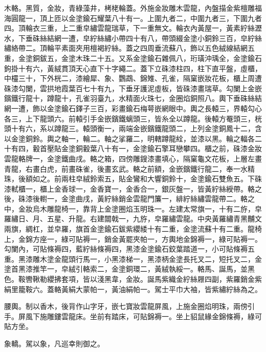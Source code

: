 \begin{pinyinscope}
 木輅。黑質，金妝，青綠藻井，栲栳輪蓋。外施金妝雕木雲龍，內盤描金紫檀雕福海圓龍一，頂上匝以金塗鍮石耀葉八十有一。上圍九者二，中圍九者三，下圍九者四。頂輪衣三重，上二重皁繡雲龍瑞草，下一重無文。輪衣內黃屋一，黃素紵絲瀝水，下垂硃絲結網一遭，皁紵絲繡小帶四十有八，帶頭綴金塗小銅鈴三百，皁紵絲繡絡帶二。頂輪平素面夾用檀褐紵絲。蓋之四周垂流蘇八，飾以五色絨線結網五重，金塗銅鈸五，金塗木珠二十五。又系金塗鍮石雜佩八，珩璜沖瑀全，金塗鍮石鉤掛十有六，黃絨貫頂天心直下十字繩二。蓋下立硃漆柱四，柱下直平盤，虛櫃，中欞三十，下外桄二，漆繪犀、象、鸚鵡、錦雉、孔雀，隔窠嵌妝花板，櫃上周遭硃漆勾闌，雲拱地霞葉百七十有九，下垂牙護泥虛板，皆硃漆畫瑞草。勾闌上金嵌鑌鐵行龍十，蹲龍十，孔雀羽臺九，水精面火珠七，金圈焰銅照八。輿下垂硃絲結網一遭，飾以金塗鍮石鐸子三百，彩畫鍮石梅萼嵌網眼中。輿之長轅三，界轅勾心各三，上下龍頭六。前轅引手金嵌鑌鐵螭頭三，皆糸全以蹲龍。後轅方罨頭三，桄頭十有六，系以蹲龍三。轅頭衡一，兩端金嵌鑌鐵龍頭二，上列金塗銅鳳十二，含以金塗銅鈴。輿之軸一，輪二。軸之挲羅二，明轄蹲龍絟，並漆以黑。輪之輻各二十有四，轂首壓貼金塗銅轂葉八十有一，金塗鍮石擎耳戀攀四。櫃之前，硃漆金妝雲龍輅牌一，金塗鐵曲戌。輅之箱，四傍雕鎪漆畫填心，隔窠龜文花板，上層左畫青龍，右畫白虎，前畫硃雀，後畫玄武。輅之前額，金嵌鑌鐵行龍二，奉一水精珠，後額如之。前兩柱皁絨鈴索五，貼金鸞和大響銅鈴十，金塗鍮石雙魚五。下硃漆軾櫃一，櫃上金香球一，金香寶一，金香合一，銀灰盤一，皆黃紵絲綬帶。輅之後，硃漆後轛一，金塗曲戌，黃紵絲銷金雲龍門簾一，緋紵絲繡雲龍帶二。輅之中，金妝烏木雕龍椅一，靠背上金塗圈焰玉明珠一。左建太常旗一，十有二斿，皁羅繡日、月、五星、升龍。右建闒戟一，九斿，皁羅繡雲龍。中央黃羅繡青黑黼文兩旗，綢杠，並皁羅，旗首金塗鍮石鈸紫纓緌十有二重，金塗流蘇十有二重。龍椅上，金錦方座一，綠可貼褥一，銷金黃罷夾帕一，方輿地金錦褥一，綠可貼褥一。勾闌內，可貼條褥四，藍紵絲條褥四，黑漆金塗鍮石鉸葉踏道一，小可貼條褥五重。黑漆雕木塗金龍頭行馬一，小黑漆梯一，黑漆柄金塗長托叉二，短托叉二，金塗首黑漆推竿一，皁絨引輅索二，金塗銅環二，黃絨執綏一。輅馬、誕馬，並黑色。鞍轡鞦勒纓拂套項，皆以淺黑韋，金妝。誕馬紫織金紵絲屜四副，紫羅銷金紫絹里籠鞍六。蓋輅黃絹大蒙帕一，黃油絹帕一。駕士平巾大袖，皆紫繡紵絲為之。



 腰輿。制以香木，後背作山字牙，嵌七寶妝雲龍屏風，上施金圈焰明珠，兩傍引手。屏風下施雕鏤雲龍床。坐前有踏床，可貼錦褥一。坐上貂鼠緣金錦條褥，綠可貼方坐。



 象轎。駕以象，凡巡幸則御之。



\end{pinyinscope}
